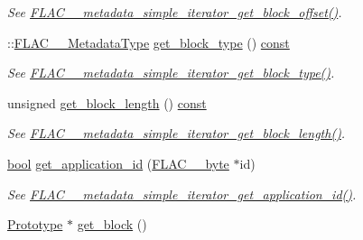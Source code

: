 \begin{DoxyCompactItemize}
\begin{DoxyCompactList}\small\item\em See \hyperlink{group__flac__metadata__level1_ga46e158a3f70c0e39db9c68a9ff9a2621}{F\+L\+A\+C\+\_\+\+\_\+metadata\+\_\+simple\+\_\+iterator\+\_\+get\+\_\+block\+\_\+offset()}. \end{DoxyCompactList}\item 
\+::\hyperlink{group__flac__format_gac71714ba8ddbbd66d26bb78a427fac01}{F\+L\+A\+C\+\_\+\+\_\+\+Metadata\+Type} \hyperlink{class_f_l_a_c_1_1_metadata_1_1_simple_iterator_a0f02b8568660a7dcf2db7171a3dee777}{get\+\_\+block\+\_\+type} () \hyperlink{getopt1_8c_a2c212835823e3c54a8ab6d95c652660e}{const} 
\begin{DoxyCompactList}\small\item\em See \hyperlink{group__flac__metadata__level1_ga4649a49d230ac8bfc3ec88f5196205bb}{F\+L\+A\+C\+\_\+\+\_\+metadata\+\_\+simple\+\_\+iterator\+\_\+get\+\_\+block\+\_\+type()}. \end{DoxyCompactList}\item 
unsigned \hyperlink{class_f_l_a_c_1_1_metadata_1_1_simple_iterator_a9c1c90462df4e4b67279a44769d600e2}{get\+\_\+block\+\_\+length} () \hyperlink{getopt1_8c_a2c212835823e3c54a8ab6d95c652660e}{const} 
\begin{DoxyCompactList}\small\item\em See \hyperlink{group__flac__metadata__level1_gaad69b5d6c58c48e08dcfb3f1018c2602}{F\+L\+A\+C\+\_\+\+\_\+metadata\+\_\+simple\+\_\+iterator\+\_\+get\+\_\+block\+\_\+length()}. \end{DoxyCompactList}\item 
\hyperlink{mac_2config_2i386_2lib-src_2libsoxr_2soxr-config_8h_abb452686968e48b67397da5f97445f5b}{bool} \hyperlink{class_f_l_a_c_1_1_metadata_1_1_simple_iterator_a426d06a9d079f74e82eaa217f14997a5}{get\+\_\+application\+\_\+id} (\hyperlink{ordinals_8h_a5eb569b12d5b047cdacada4d57924ee3}{F\+L\+A\+C\+\_\+\+\_\+byte} $\ast$id)
\begin{DoxyCompactList}\small\item\em See \hyperlink{group__flac__metadata__level1_gaf2db2a96f7c60100d620a2eefb8360bc}{F\+L\+A\+C\+\_\+\+\_\+metadata\+\_\+simple\+\_\+iterator\+\_\+get\+\_\+application\+\_\+id()}. \end{DoxyCompactList}\item 
\hyperlink{class_f_l_a_c_1_1_metadata_1_1_prototype}{Prototype} $\ast$ \hyperlink{class_f_l_a_c_1_1_metadata_1_1_simple_iterator_a61de602276e5159253b21a19590d3584}{get\+\_\+block} ()

\end{DoxyCompactItemize}
